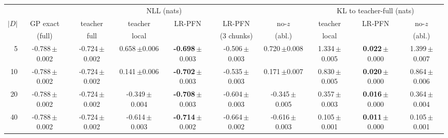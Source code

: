 \begin{tabular}{r cccccc ccc}
\toprule
 & \multicolumn{6}{c}{NLL (nats)} & \multicolumn{3}{c}{KL to teacher-full (nats)}\\
\cmidrule(lr){2-7}\cmidrule(lr){8-10}
$|D|$ & GP exact & teacher & teacher & LR-PFN & LR-PFN & no-$z$ & teacher & LR-PFN & no-$z$\\
 & (full) & full & local & & (3 chunks) & (abl.) & local & & (abl.)\\
\midrule
5 & -0.788\,{\scriptsize$\pm$0.002} & -0.724\,{\scriptsize$\pm$0.002} & 0.658\,{\scriptsize$\pm$0.006} & \textbf{-0.698}\,{\scriptsize$\pm$0.003} & -0.506\,{\scriptsize$\pm$0.003} & 0.720\,{\scriptsize$\pm$0.008} & 1.334\,{\scriptsize$\pm$0.005} & \textbf{0.022}\,{\scriptsize$\pm$0.000} & 1.399\,{\scriptsize$\pm$0.007}\\
10 & -0.788\,{\scriptsize$\pm$0.002} & -0.724\,{\scriptsize$\pm$0.002} & 0.141\,{\scriptsize$\pm$0.006} & \textbf{-0.702}\,{\scriptsize$\pm$0.003} & -0.535\,{\scriptsize$\pm$0.003} & 0.171\,{\scriptsize$\pm$0.007} & 0.830\,{\scriptsize$\pm$0.005} & \textbf{0.020}\,{\scriptsize$\pm$0.000} & 0.864\,{\scriptsize$\pm$0.006}\\
20 & -0.788\,{\scriptsize$\pm$0.002} & -0.724\,{\scriptsize$\pm$0.002} & -0.349\,{\scriptsize$\pm$0.004} & \textbf{-0.708}\,{\scriptsize$\pm$0.003} & -0.604\,{\scriptsize$\pm$0.003} & -0.345\,{\scriptsize$\pm$0.005} & 0.357\,{\scriptsize$\pm$0.003} & \textbf{0.016}\,{\scriptsize$\pm$0.000} & 0.364\,{\scriptsize$\pm$0.004}\\
40 & -0.788\,{\scriptsize$\pm$0.002} & -0.724\,{\scriptsize$\pm$0.002} & -0.614\,{\scriptsize$\pm$0.003} & \textbf{-0.714}\,{\scriptsize$\pm$0.002} & -0.664\,{\scriptsize$\pm$0.002} & -0.616\,{\scriptsize$\pm$0.003} & 0.105\,{\scriptsize$\pm$0.001} & \textbf{0.011}\,{\scriptsize$\pm$0.000} & 0.105\,{\scriptsize$\pm$0.001}\\
\bottomrule
\end{tabular}
